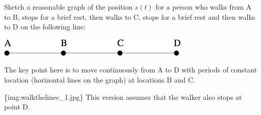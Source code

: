 \documentclass{ximera}
\author{Emma Smith Zbarsky}
\begin{document}
\begin{exercise}

Sketch a reasonable graph of the position $s(t)$ for a person who walks
from A to B, stops for a brief rest, then walks to C, stops for a brief
rest and then walks to D on the following line:


\begin{image}\includegraphics[width=.5\textwidth]{line-with-pts.jpg}\end{image}


\begin{hint}
The key point here is to move continuously from A to D with periods of
constant location (horizontal lines on the graph) at locations B and C.
\end{hint}


\begin{hint}
\{img:walkthelinec\_1.jpg\} This version assumes that the walker also
stops at point D.
\end{hint}



\end{exercise}
\end{document}
